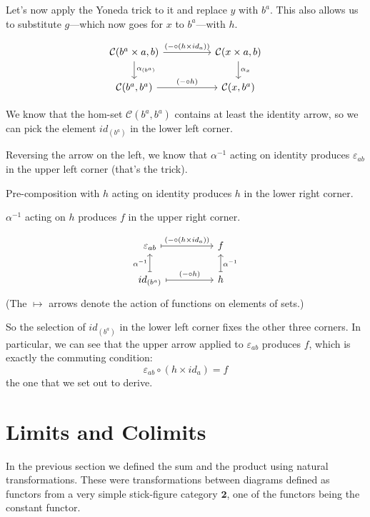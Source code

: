 \documentclass[DaoFP]{subfiles}
\begin{document}
Let's now apply the Yoneda trick to it and replace $y$ with $b^a$. This also allows us to substitute $g$---which now goes for $x$ to $b^a$---with $h$. 

\[
 \begin{tikzcd}
 \mathcal{C}(b^a \times a, b)
 \arrow[rr, "(- \circ (h \times id_a))"]
 \arrow[d,  "\alpha_{(b^a)}"]
& &
\mathcal{C}(x \times a, b)
  \arrow[d,  "\alpha_x"]
 \\
 \mathcal{C}(b^a, b^a)
 \arrow[rr, "(- \circ h)"]
& &
\mathcal{C}(x, b^a)
 \end{tikzcd}
\]

We know that the hom-set $\mathcal{C}(b^a, b^a)$ contains at least the identity arrow, so we can pick the element $id_{(b^a)}$ in the lower left corner. 

Reversing the arrow on the left, we know that $\alpha^{-1}$ acting on identity produces $\varepsilon_{a b}$ in the upper left corner (that's the  trick). 

Pre-composition with $h$ acting on identity produces $h$ in the lower right corner. 

$\alpha^{-1}$ acting on $h$ produces $f$ in the upper right corner. 

\[
 \begin{tikzcd}[
  every arrow/.style={draw,mapsto}
]
 \varepsilon_{a b}
 \arrow[rr, "(- \circ (h \times id_a))"]
& &
f
 \\
 id_{(b^a)}
 \arrow[u, "\alpha^{-1}"]
 \arrow[rr, "(- \circ h)"]
& &
h
\arrow[u, "\alpha^{-1}"']
 \end{tikzcd}
\]
(The $\mapsto$ arrows denote the action of functions on elements of sets.)


So the selection of $id_{(b^a)}$ in the lower left corner fixes the other three corners. In particular, we can see that the upper arrow applied to $\varepsilon_{a b}$ produces $f$, which is exactly the commuting condition:
\[ \varepsilon_{a b} \circ (h \times id_a) = f \]
the one that we set out to derive.

\section{Limits and Colimits}

In the previous section we defined the sum and the product using natural transformations. These were transformations between diagrams defined as functors from a very simple stick-figure category $\mathbf{2}$, one of the functors being the constant functor. 
\end{document}
